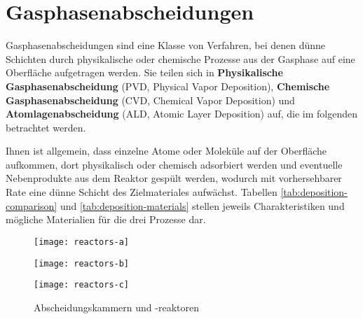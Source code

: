 \section{Gasphasenabscheidungen}

Gasphasenabscheidungen sind eine Klasse von Verfahren, bei denen dünne Schichten durch physikalische oder chemische Prozesse aus der Gasphase auf eine Oberfläche aufgetragen werden.
Sie teilen sich in \textbf{Physikalische Gasphasenabscheidung} (PVD, Physical Vapor Deposition), \textbf{Chemische Gasphasenabscheidung} (CVD, Chemical Vapor Deposition) und \textbf{Atomlagenabscheidung} (ALD, Atomic Layer Deposition) auf, die im folgenden betrachtet werden.

Ihnen ist allgemein, dass einzelne Atome oder Moleküle auf der Oberfläche aufkommen, dort physikalisch oder chemisch adsorbiert werden und eventuelle Nebenprodukte aus dem Reaktor gespült werden, wodurch mit vorhersehbarer Rate eine dünne Schicht des Zielmateriales aufwächst.
Tabellen \ref{tab:deposition-comparison} und \ref{tab:deposition-materials} stellen jeweils Charakteristiken und mögliche Materialien für die drei Prozesse dar.

\begin{figure}
  \captionsetup[subfigure]{format=plain}
  \parbox[c]{.3\linewidth}{
    \texttt{[image: reactors-a]}
  }\hfill
  \parbox[c]{.65\textwidth}{
    \label{fig:datastructures-a}
  }

  \vspace{1em}

  \parbox[c]{.3\linewidth}{
    \texttt{[image: reactors-b]}
  }\hfill
  \parbox[c]{.65\textwidth}{
    \label{fig:datastructures-b}
  }

  \vspace{1em}

  \parbox[c]{.3\linewidth}{
    \texttt{[image: reactors-c]}
  }\hfill
  \parbox[c]{.65\textwidth}{
    \label{fig:datastructures-c}
  }

  \caption[Abscheidungskammern und -reaktoren]{Abscheidungskammern und -reaktoren}
  \label{fig:reactors}
\end{figure}


